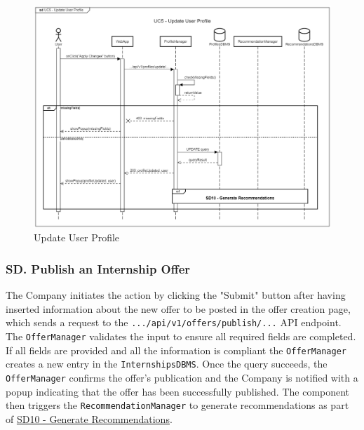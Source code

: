 \begin{figure}[H]
    \begin{center}
         \includegraphics[width=1\linewidth]{LaTeXCode/images/SequenceDiagrams/UC5-sequenceDiagram.png}
         \caption{Update User Profile}
         \label{fig:update_profile_sd}
     \end{center}
\end{figure}

\newpage

\subsubsection*{SD\cuc. Publish an Internship Offer}
\label{subsubsec:publish_offer_sd}
The Company initiates the action by clicking the "Submit" button after having inserted information about the new offer to be posted in the offer creation page, which sends a request to the \texttt{.../api/v1/offers/publish/...} API endpoint. The \texttt{OfferManager} validates the input to ensure all required fields are completed.
If all fields are provided and all the information is compliant the \texttt{OfferManager} creates a new entry in the \texttt{InternshipsDBMS}.
Once the query succeeds, the \texttt{OfferManager} confirms the offer's publication and the Company is notified with a popup indicating that the offer has been successfully published. The component then triggers the \texttt{RecommendationManager} to generate recommendations as part of \hyperref[fig:generate_recommendations_sd]{\protect\uline{SD10 - Generate Recommendations}}.


